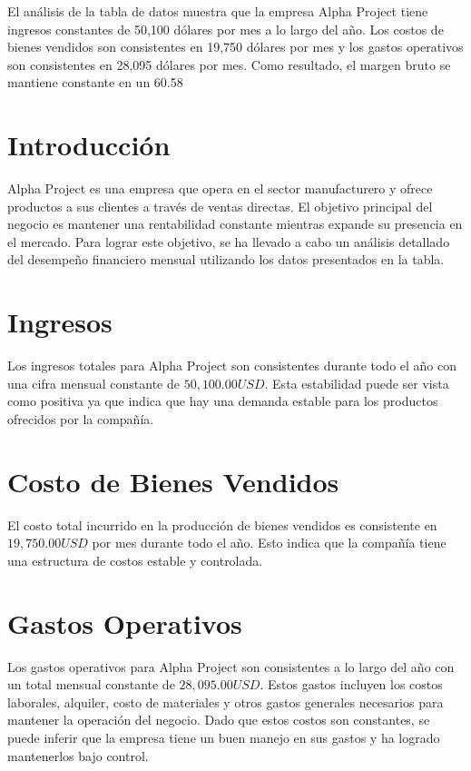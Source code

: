 El análisis de la tabla de datos muestra que la empresa Alpha Project tiene ingresos constantes de 50,100 dólares por mes a lo largo del año. Los costos de bienes vendidos son consistentes en 19,750 dólares por mes y los gastos operativos son consistentes en 28,095 dólares por mes. Como resultado, el margen bruto se mantiene constante en un 60.58%

\section{Introducción}
Alpha Project es una empresa que opera en el sector manufacturero y ofrece productos a sus clientes a través de ventas directas. El objetivo principal del negocio es mantener una rentabilidad constante mientras expande su presencia en el mercado. Para lograr este objetivo, se ha llevado a cabo un análisis detallado del desempeño financiero mensual utilizando los datos presentados en la tabla.

\section{Ingresos}
Los ingresos totales para Alpha Project son consistentes durante todo el año con una cifra mensual constante de $50,100.00 USD$. Esta estabilidad puede ser vista como positiva ya que indica que hay una demanda estable para los productos ofrecidos por la compañía.

\section{Costo de Bienes Vendidos}
El costo total incurrido en la producción de bienes vendidos es consistente en $19,750.00 USD$ por mes durante todo el año. Esto indica que la compañía tiene una estructura de costos estable y controlada.

\section{Gastos Operativos}
Los gastos operativos para Alpha Project son consistentes a lo largo del año con un total mensual constante de $28,095.00 USD$. Estos gastos incluyen los costos laborales, alquiler, costo de materiales y otros gastos generales necesarios para mantener la operación del negocio. Dado que estos costos son constantes, se puede inferir que la empresa tiene un buen manejo en sus gastos y ha logrado mantenerlos bajo control.

